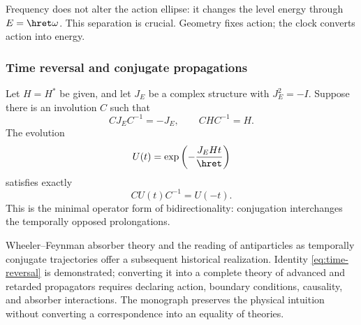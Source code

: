 Frequency does not alter the action ellipse: it changes the level energy
through \(E=\hret\omega\). This separation is crucial. Geometry fixes
action; the clock converts action into energy.

\subsubsection{Time reversal and conjugate propagations}

Let \(H=H^*\) be given, and let \(J_E\) be a complex structure with \(J_E^2=-I\). Suppose there is an involution \(C\) such that
\[
CJ_EC^{-1}=-J_E,\qquad CHC^{-1}=H.
\]
The evolution
\begin{equation}
U(t)=\exp\left(-\frac{J_EHt}{\hret}\right)
\label{eq:evolution-J}
\end{equation}
satisfies exactly
\begin{equation}
CU(t)C^{-1}=U(-t).
\label{eq:time-reversal}
\end{equation}
This is the minimal operator form of bidirectionality: conjugation
interchanges the temporally opposed prolongations.

Wheeler--Feynman absorber theory and the reading of antiparticles
as temporally conjugate trajectories offer a subsequent historical realization.
Identity \eqref{eq:time-reversal} is demonstrated; converting it
into a complete theory of advanced and retarded propagators requires declaring
action, boundary conditions, causality, and absorber interactions.
The monograph preserves the physical intuition without converting a correspondence
into an equality of theories.

